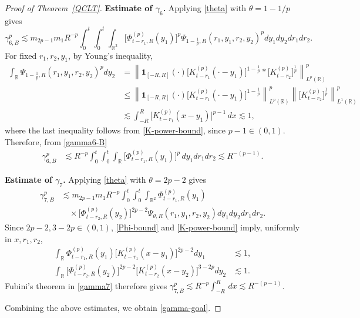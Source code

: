 \documentclass[12pt]{article}
\def\bR{\mathbb{R}}
\begin{document}
\begin{proof}[ Proof of Theorem~\ref{QCLT}]
{\bf Estimate of $\gamma_6$.} Applying \eqref{theta} with
$\theta=1-1/p$ gives
\begin{equation}
\label{gamma6-B}
\gamma_{6,B}^p
\lesssim
m_{2p-1}m_1 R^{-p}
\int_0^t\int_0^t\int_{\bR^2}
\big[\Phi_{t-r_1,R}^{(p)}(y_1)\big]^p
\Psi_{1-\frac1p,R}(r_1,y_1,r_2,y_2)^p
dy_1dy_2dr_1dr_2.
\end{equation}
For fixed \(r_1,r_2,y_1\), by Young's inequality,
\begin{align*}
\int_{\bR}
\Psi_{1-\frac1p,R}(r_1,y_1,r_2,y_2)^p dy_2 &=   \left\|
\mathbf 1_{[-R,R]}(\cdot)
\big[K_{t-r_1}^{(p)}(\cdot-y_1)\big]^{1-\frac1p}
*
\big[K_{t-r_2}^{(p)}\big]^{\frac1p}
\right\|_{L^p(\bR)}^p  \\
&\le \left\|
\mathbf 1_{[-R,R]}(\cdot)
\big[K_{t-r_1}^{(p)}(\cdot-y_1)\big]^{1-\frac1p}
\right\|_{L^p(\bR)}^p
\left\|
\big[K_{t-r_2}^{(p)}\big]^{\frac1p}
\right\|_{L^1(\bR)}^p  \\
&\lesssim \int_{-R}^{R}
\big[K_{t-r_1}^{(p)}(x-y_1)\big]^{p-1}\,dx
\lesssim 1,
\end{align*}
where the last inequality follows from \eqref{K-power-bound}, since
\(p-1\in(0,1)\). Therefore, from \eqref{gamma6-B}
\begin{align*}
\gamma_{6,B}^p
&\lesssim  R^{-p}
\int_0^t\int_0^t\int_{\bR}
\big[\Phi_{t-r_1,R}^{(p)}(y_1)\big]^p
\,dy_1dr_1dr_2  \lesssim R^{-(p-1)}.
\end{align*}


{\bf Estimate of $\gamma_7$.}  Applying \eqref{theta} with
$\theta=2p-2$ gives
\begin{align}
\label{gamma7}
\gamma_{7,B}^p
&\lesssim m_{2p-1}m_1 R^{-p}
\int_0^t\int_0^t\int_{\bR^2}
\Phi_{t-r_1,R}^{(p)}(y_1)
\nonumber\\[-1mm]
&\quad\times
\big[\Phi_{t-r_2,R}^{(p)}(y_2)\big]^{2p-2}
\Psi_{\theta,R}(r_1,y_1,r_2,y_2)
dy_1dy_2dr_1dr_2.
\end{align}
Since $2p-2,3-2p\in(0,1)$, \eqref{Phi-bound} and
\eqref{K-power-bound} imply, uniformly in $x,r_1,r_2$,
\begin{align*}
\int_{\bR}
\Phi_{t-r_1,R}^{(p)}(y_1)
\big[K_{t-r_1}^{(p)}(x-y_1)\big]^{2p-2}dy_1
&\lesssim1,\\
\int_{\bR}
\big[\Phi_{t-r_2,R}^{(p)}(y_2)\big]^{2p-2}
\big[K_{t-r_2}^{(p)}(x-y_2)\big]^{3-2p}dy_2
&\lesssim1.
\end{align*}
 Fubini's theorem in \eqref{gamma7} therefore gives
$\gamma_{7,B}^p\lesssim R^{-p}\int_{-R}^{R}\,dx\lesssim R^{-(p-1)}$.

\medskip
Combining the above estimates, we obtain \eqref{gamma-goal}.
\end{proof}
\end{document}
